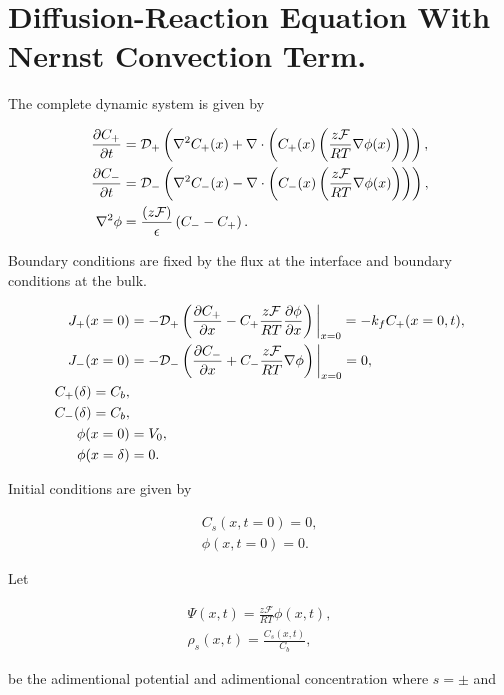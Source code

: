 \section{Diffusion-Reaction Equation With Nernst Convection Term.}


The complete dynamic system is given by

\begin{align} \label{eq:diffusion-nernst}
\frac{\partial C_+}{\partial t} &= \mathcal{D_+}\left(\nabla^2 C_+(x) +\nabla \cdot \left({C_+(x)\left({\frac{z \mathcal{F}}{RT}\nabla\phi(x)}\right)}\right)\right), \\
\frac{\partial C_-}{\partial t} &= \mathcal{D_-}\left(\nabla^2 C_-(x) -\nabla \cdot \left({C_-(x)\left({\frac{z \mathcal{F}}{RT}\nabla\phi(x)}\right)}\right)\right),\\
	\nabla^2 \phi &= \frac{\left({z\mathcal{F}}\right)}{\epsilon}\left({C_- - C_+}\right).
\end{align}

Boundary conditions are fixed by the flux at the interface and boundary conditions at the bulk.

\begin{align}
    J_+(x = 0) &= -\mathcal{D}_+\left({\frac{\partial C_+}{\partial x} - C_+ \frac{z\mathcal{F}}{RT}\frac{\partial\phi}{\partial x}}\right)\bigg|_{x= 0}= -k_f C_+(x = 0, t),\\
    J_-(x = 0) &= -\mathcal{D}_-\left({\frac{\partial C_-}{\partial x} + C_- \frac{z\mathcal{F}}{RT}\nabla\phi}\right) \bigg|_{x= 0} = 0,\\
    C_+(\delta) = C_b,\\
    C_-(\delta) = C_b,\\
    \phi(x = 0) &= V_0,\\
    \phi(x = \delta) &= 0.
\end{align}

Initial conditions are given by

\begin{align}
	C_s(x, t=0) = 0,\\
	\phi (x,t=0) = 0.
\end{align}

Let 

\begin{align}
	\Psi(x, t) = \frac{z\mathcal{F}}{RT}\phi(x, t), \\
	\rho_s(x, t) = \frac{C_s(x, t)}{C_b},
\end{align}

be the adimentional potential and adimentional concentration where $s=\pm$ and 

